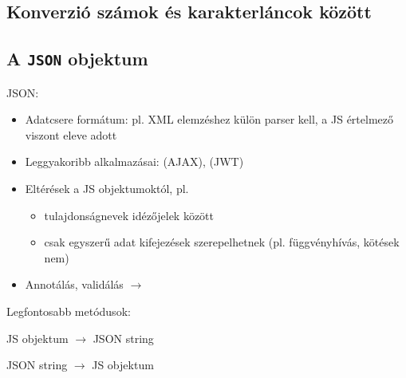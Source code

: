 \subsection{Konverzió számok és karakterláncok között}

\begin{frame}
  \begin{exampleblock}{}
    
  \end{exampleblock}
\end{frame}

\subsection{A \texttt{JSON} objektum}

\begin{frame}
  JSON: 
  \begin{itemize}
    \item Adatcsere formátum: pl. XML elemzéshez külön parser kell, a JS értelmező viszont eleve adott
    \item Leggyakoribb alkalmazásai:  (AJAX),  (JWT)
    \item Eltérések a JS objektumoktól, pl.
    \begin{itemize}
      \item tulajdonságnevek idézőjelek között
      \item csak egyszerű adat kifejezések szerepelhetnek (pl. függvényhívás, kötések nem)
    \end{itemize}
    \item Annotálás, validálás $\to$ 
  \end{itemize}
  Legfontosabb metódusok:
  \begin{description}[m]
    \item[\texttt{stringify()}] JS objektum $\to$ JSON string 
    \item[\texttt{parse()}] JSON string $\to$ JS objektum
  \end{description}
\end{frame}

\begin{frame}
  \begin{exampleblock}{}
    \footnotesize
    \vspace{-.3cm}
    
    \vspace{-.3cm}
  \end{exampleblock}
\end{frame}

